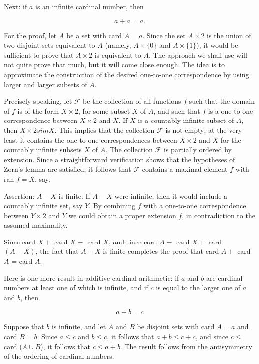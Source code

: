 Next: if $a$ is an infinite cardinal number, then 

\begin{equation*}
a + a = a. 
\end{equation*}

For the proof, let $A$ be a set with card $A = a$. Since the set $A \times 2$ is the union of two disjoint sets equivalent to $A$ (namely, $A \times \{ 0 \}$ and $A \times \{ 1 \}$), it would be sufficient to prove that $A \times 2$ is equivalent to $A$. The approach we shall use will not quite prove that much, but it will come close enough. The idea is to approximate the construction of the desired one-to-one correspondence by using larger and larger subsets of $A$. 

Precisely speaking, let $\mathcal{F}$ be the collection of all functions $f$ such that the domain of $f$ is of the form $X \times 2$, for some subset $X$ of $A$, and such that $f$ is a one-to-one correspondence between $X \times 2$ and $X$. If $X$ is a countably infinite subset of $A$, then $X \times 2 sim X$. This implies that the collection $\mathcal{F}$ is not empty; at the very least it contains the one-to-one correspondences between $X \times 2$ and $X$ for the countably infinite subsets $X$ of $A$. The collection $\mathcal{F}$ is partially ordered by extension. Since a straightforward verification shows that the hypotheses of Zorn's lemma are satisfied, it follows that $\mathcal{F}$ contains a maximal element $f$ with ran $f = X$, say. 

Assertion: $A - X$ is finite. If $A - X$ were infinite, then it would include a countably infinite set, say $Y$. By combining $f$ with a one-to-one correspondence between $Y \times 2$ and $Y$ we could obtain a proper extension $f$, in contradiction to the assumed maximality. 

Since card $X +$ card $X =$ card $X$, and since card $A = $ card $X +$ card $(A - X)$, the fact that $A - X$ is finite completes the proof that card $A +$ card $A$ = card $A$.

Here is one more result in additive cardinal arithmetic: if $a$ and $b$ are cardinal numbers at least one of which is infinite, and if $c$ is equal to the larger one of $a$ and $b$, then 

\begin{equation*}
a + b = c
\end{equation*}

Suppose that $b$ is infinite, and let $A$ and $B$ be disjoint sets with card $A = a$ and card $B = b$. Since $a \le c$ and $b \le c$, it follows that $a + b \le c + c$, and since $c \le$ card ($A \cup B$), it follows that $c \le a + b$. The result follows from the antisymmetry of the ordering of cardinal numbers. 

